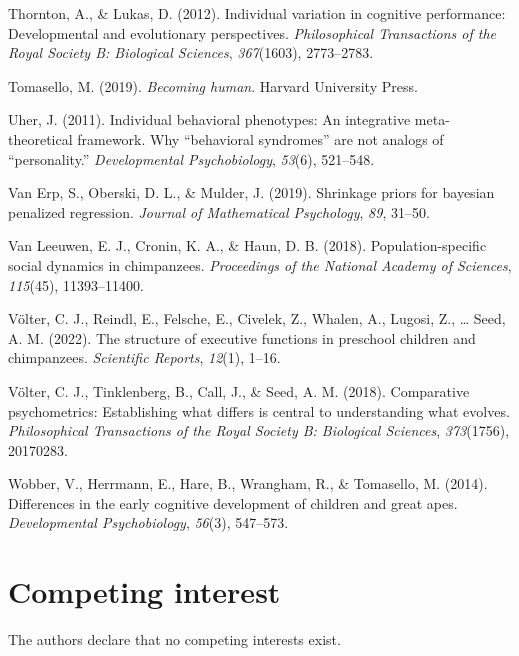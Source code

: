 \documentclass[
  man,floatsintext]{apa6}
\newlength{\cslhangindent}
\newlength{\cslentryspacingunit} %
\newenvironment{CSLReferences}[2] %
 {%
  \setlength{\parindent}{0pt}
  \ifodd #1
  \let\oldpar\par
  \def\par{\hangindent=\cslhangindent\oldpar}
  \fi
  \setlength{\parskip}{#2\cslentryspacingunit}
 }%
 {}
\begin{document}
\begin{CSLReferences}{1}{0}
\leavevmode{}%
Thornton, A., \& Lukas, D. (2012). Individual variation in cognitive performance: Developmental and evolutionary perspectives. \emph{Philosophical Transactions of the Royal Society B: Biological Sciences}, \emph{367}(1603), 2773--2783.

\leavevmode{}%
Tomasello, M. (2019). \emph{Becoming human}. Harvard University Press.

\leavevmode{}%
Uher, J. (2011). Individual behavioral phenotypes: An integrative meta-theoretical framework. Why {``behavioral syndromes''} are not analogs of {``personality.''} \emph{Developmental Psychobiology}, \emph{53}(6), 521--548.

\leavevmode{}%
Van Erp, S., Oberski, D. L., \& Mulder, J. (2019). Shrinkage priors for bayesian penalized regression. \emph{Journal of Mathematical Psychology}, \emph{89}, 31--50.

\leavevmode{}%
Van Leeuwen, E. J., Cronin, K. A., \& Haun, D. B. (2018). Population-specific social dynamics in chimpanzees. \emph{Proceedings of the National Academy of Sciences}, \emph{115}(45), 11393--11400.

\leavevmode{}%
Völter, C. J., Reindl, E., Felsche, E., Civelek, Z., Whalen, A., Lugosi, Z., \ldots{} Seed, A. M. (2022). The structure of executive functions in preschool children and chimpanzees. \emph{Scientific Reports}, \emph{12}(1), 1--16.

\leavevmode{}%
Völter, C. J., Tinklenberg, B., Call, J., \& Seed, A. M. (2018). Comparative psychometrics: Establishing what differs is central to understanding what evolves. \emph{Philosophical Transactions of the Royal Society B: Biological Sciences}, \emph{373}(1756), 20170283.

\leavevmode{}%
Wobber, V., Herrmann, E., Hare, B., Wrangham, R., \& Tomasello, M. (2014). Differences in the early cognitive development of children and great apes. \emph{Developmental Psychobiology}, \emph{56}(3), 547--573.

\end{CSLReferences}

\endgroup

\newpage

\hypertarget{competing-interest}{%
\section{Competing interest}\label{competing-interest}}

The authors declare that no competing interests exist.
\end{document}

